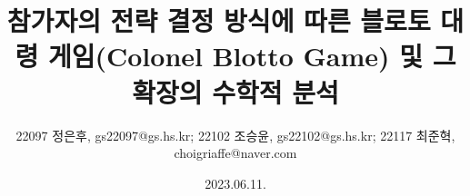 \title{참가자의 전략 결정 방식에 따른 블로토 대령 게임(Colonel Blotto Game) 및 그 확장의 수학적 분석}
\author{22097 정은후, gs22097@gs.hs.kr; 22102 조승윤, gs22102@gs.hs.kr; 22117 최준혁, choigriaffe@naver.com}
\date{2023.06.11.}
